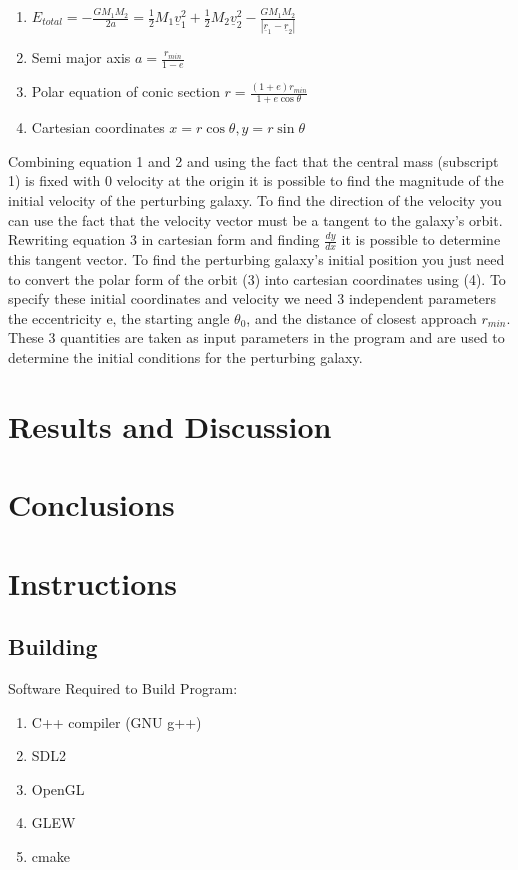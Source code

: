 \documentclass[10pt,a4paper]{article}
\begin{document}
\begin{enumerate}
\item $E_{total} = -\frac{G M_1 M_2}{2 a} =\frac{1}{2} M_1 \underline{v}_1^2 + \frac{1}{2} M_2 \underline{v}_2^2 -\frac{G M_1 M_2}{|\underline{r}_1-\underline{r}_2|}$
\item Semi major axis $a = \frac{r_{min}}{1-e}$
\item Polar equation of conic section $r = \frac{(1+e)r_{min}}{1+e\cos{\theta}}$
\item Cartesian coordinates $x=r\cos{\theta},y=r\sin{\theta}$
\end{enumerate}

Combining equation 1 and 2 and using the fact that the central mass (subscript 1) is fixed with 0 velocity at the origin it is possible to find the magnitude of the initial velocity of the perturbing galaxy. To find the direction of the velocity you can use the fact that the velocity vector must be a tangent to the galaxy's orbit. Rewriting equation 3 in cartesian form and finding $\frac{dy}{dx}$ it is possible to determine this tangent vector. To find the perturbing galaxy's initial position you just need to convert the polar form of the orbit (3) into cartesian coordinates using (4). To specify these initial coordinates and velocity we need 3 independent parameters the eccentricity e, the starting angle $\theta_0$, and the distance of closest approach $r_{min}$. These 3 quantities are taken as input parameters in the program and are used to determine the initial conditions for the perturbing galaxy.

\clearpage
\section{Results and Discussion}


\clearpage
\section{Conclusions}

\clearpage
\section{Instructions}
\subsection{Building}
Software Required to Build Program:
\\
\begin{enumerate}
\item C++ compiler (GNU g++)
\item SDL2
\item OpenGL
\item GLEW
\item cmake
\end{enumerate}
\end{document}
